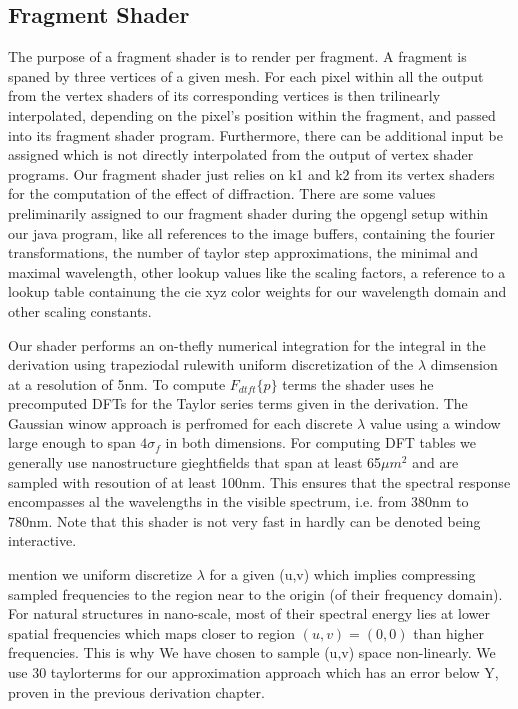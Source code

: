 \subsection{Fragment Shader}
The purpose of a fragment shader is to render per fragment. A fragment is spaned by three vertices of a given mesh. For each pixel within all the output from the vertex shaders of its corresponding vertices is then trilinearly interpolated, depending on the pixel's position within the fragment, and passed into its fragment shader program.
Furthermore, there can be additional input be assigned which is not directly interpolated from the output of vertex shader programs. Our fragment shader just relies on k1 and k2 from its vertex shaders for the computation of the effect of diffraction.
There are some values preliminarily assigned to our fragment shader during the opgengl setup within our java program, like all references to the image buffers, containing the fourier transformations, the number of taylor step approximations, the minimal and maximal wavelength, other lookup values like the scaling factors, a reference to a lookup table containung the cie xyz color weights for our wavelength domain and other scaling constants.

Our shader performs an on-thefly numerical integration for the integral in the derivation using trapeziodal rulewith uniform discretization of the $\lambda$ dimsension at a resolution of 5nm. To compute $F_{dtft}\{p\}$ terms the shader uses he precomputed DFTs for the Taylor series terms given in the derivation. The Gaussian winow approach is perfromed for each discrete $\lambda$ value using a window large enough to span $4\sigma_f$ in both dimensions. For computing DFT tables we generally use nanostructure gieghtfields that span at least 65$\mu m^2$ and are sampled with resoution of at least 100nm. This ensures that the spectral response encompasses al the wavelengths in the visible spectrum, i.e. from 380nm to 780nm. Note that this shader is not very fast in hardly can be denoted being interactive. 

mention we uniform discretize $\lambda$ for a given (u,v) which implies compressing sampled frequencies to the region near to the origin (of their frequency domain). 
For natural structures in nano-scale, most of their spectral energy lies at lower spatial frequencies which maps closer to region $(u,v) = (0,0)$ than higher frequencies. This is why We have chosen to sample (u,v) space non-linearly. We use 30 taylorterms for our approximation approach which has an error below Y, proven in the previous derivation chapter.

